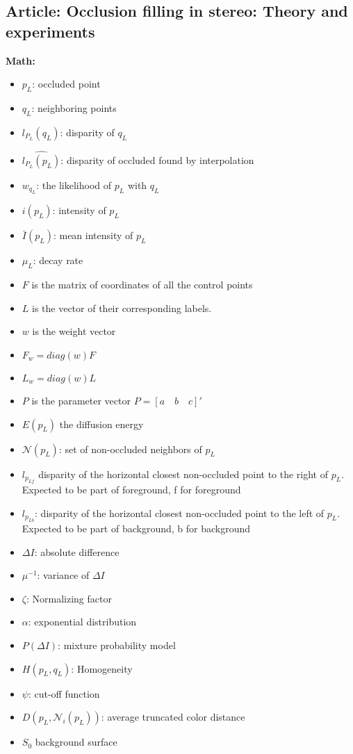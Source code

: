\subsection{Article: Occlusion filling in stereo: Theory and experiments}
\textbf{Math:}
\begin{itemize}
  \item $p_L$: occluded point
  \item $q_L$: neighboring points
  \item $l_{P_L}(q_L)$: disparity of $q_L$
  \item $\hat{l_{P_L}(p_L)}$: disparity of occluded found by interpolation
  \item $w_{q_L}$: the likelihood of $p_L$ with $q_L$
  \item $i(p_L)$: intensity of $p_L$  
  \item $\bar{I}(p_L)$: mean intensity of $p_L$
  \item $\mu _L$: decay rate
  \item $F$ is the matrix of coordinates of all the control points 
  \item $L$ is the vector of their corresponding labels.  
  \item $w$ is the weight vector
  \item $F_w = diag(w)F$
  \item $L_w = diag(w)L$ 
  \item $P$ is the parameter vector $P = [a\quad b\quad c]'$
  \item $E(p_L)$ the diffusion energy
  \item $\mathcal{N}(p_L)$: set of non-occluded neighbors of $p_L$ 
  \item $l_{p_{Lf}}$ disparity of the horizontal closest non-occluded point to the right of $p_L$. Expected to be part of foreground, f for foreground
  \item $l_{p_{Lb}}$: disparity of the horizontal closest non-occluded point to the left of $p_L$. Expected to be part of background, b for background
  \item $\Delta I$: absolute difference
  \item $\mu ^{-1}$: variance of $\Delta I $
  \item $\zeta$: Normalizing factor
  \item $\alpha$: exponential distribution
  \item $P(\Delta I)$: mixture probability model
  \item $H(p_L,q_L)$: Homogeneity
  \item $\psi$: cut-off function
  \item $D(p_L,\mathcal{N}_i(p_L))$: average truncated color distance
  \item $S_0$ background surface 
\end{itemize}

